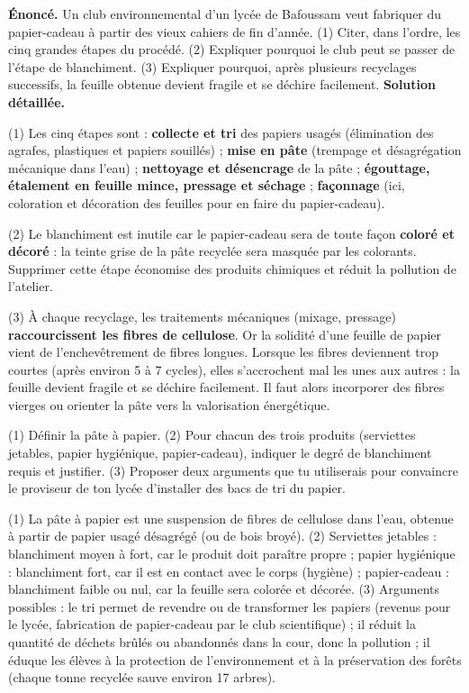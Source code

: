 \documentclass[11pt]{article}
\begin{document}
\begin{exoresolu}
\textbf{Énoncé.} Un club environnemental d'un lycée de Bafoussam veut fabriquer du papier-cadeau à partir des vieux cahiers de fin d'année. (1) Citer, dans l'ordre, les cinq grandes étapes du procédé. (2) Expliquer pourquoi le club peut se passer de l'étape de blanchiment. (3) Expliquer pourquoi, après plusieurs recyclages successifs, la feuille obtenue devient fragile et se déchire facilement.
\tcblower
\textbf{Solution détaillée.}\par
(1) Les cinq étapes sont : \textbf{collecte et tri} des papiers usagés (élimination des agrafes, plastiques et papiers souillés) ; \textbf{mise en pâte} (trempage et désagrégation mécanique dans l'eau) ; \textbf{nettoyage et désencrage} de la pâte ; \textbf{égouttage, étalement en feuille mince, pressage et séchage} ; \textbf{façonnage} (ici, coloration et décoration des feuilles pour en faire du papier-cadeau).\par
(2) Le blanchiment est inutile car le papier-cadeau sera de toute façon \textbf{coloré et décoré} : la teinte grise de la pâte recyclée sera masquée par les colorants. Supprimer cette étape économise des produits chimiques et réduit la pollution de l'atelier.\par
(3) À chaque recyclage, les traitements mécaniques (mixage, pressage) \textbf{raccourcissent les fibres de cellulose}. Or la solidité d'une feuille de papier vient de l'enchevêtrement de fibres longues. Lorsque les fibres deviennent trop courtes (après environ 5 à 7 cycles), elles s'accrochent mal les unes aux autres : la feuille devient fragile et se déchire facilement. Il faut alors incorporer des fibres vierges ou orienter la pâte vers la valorisation énergétique.
\end{exoresolu}

\begin{exercice}
(1) Définir la pâte à papier. (2) Pour chacun des trois produits (serviettes jetables, papier hygiénique, papier-cadeau), indiquer le degré de blanchiment requis et justifier. (3) Proposer deux arguments que tu utiliserais pour convaincre le proviseur de ton lycée d'installer des bacs de tri du papier.
\end{exercice}

\begin{corrige}[Exercice]
(1) La pâte à papier est une suspension de fibres de cellulose dans l'eau, obtenue à partir de papier usagé désagrégé (ou de bois broyé). (2) Serviettes jetables : blanchiment moyen à fort, car le produit doit paraître propre ; papier hygiénique : blanchiment fort, car il est en contact avec le corps (hygiène) ; papier-cadeau : blanchiment faible ou nul, car la feuille sera colorée et décorée. (3) Arguments possibles : le tri permet de revendre ou de transformer les papiers (revenus pour le lycée, fabrication de papier-cadeau par le club scientifique) ; il réduit la quantité de déchets brûlés ou abandonnés dans la cour, donc la pollution ; il éduque les élèves à la protection de l'environnement et à la préservation des forêts (chaque tonne recyclée sauve environ 17 arbres).
\end{corrige}
\end{document}
